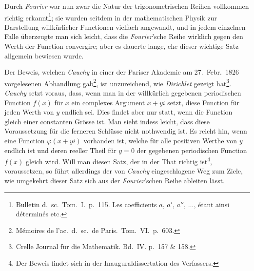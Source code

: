 \documentclass[12pt,a4paper]{article}
\begin{document}
Durch \textit{Fourier} war nun zwar die Natur der trigonometrischen Reihen vollkommen richtig erkannt\footnote{Bulletin d.\ sc.\ Tom.~I.\ p.~115. Les coefficients $a$, $a'$, $a''$, $\ldots$, étant ainsi déterminés etc.}; sie wurden seitdem in der mathematischen Physik zur Darstellung willkürlicher Functionen vielfach angewandt, und in jedem einzelnen Falle überzeugte man sich leicht, dass die \textit{Fourier}'sche Reihe wirklich gegen den Werth der Function convergire; aber es dauerte lange, ehe dieser wichtige Satz allgemein bewiesen wurde.

Der Beweis, welchen \textit{Cauchy} in einer der Pariser Akademie am 27.~Febr.\ 1826 vorgelesenen Abhandlung gab\footnote{Mémoires de l'ac.\ d.\ sc.\ de Paris.\ Tom.~VI.\ p.~603.}, ist unzureichend, wie \textit{Dirichlet} gezeigt hat\footnote{Crelle Journal für die Mathematik. Bd.~IV. p.~157 \& 158.}. \textit{Cauchy} setzt voraus, dass, wenn man in der willkürlich gegebenen periodischen Function $f(x)$ für $x$ ein complexes Argument $x + yi$ setzt, diese Function für jeden Werth von $y$ endlich sei. Dies findet aber nur statt, wenn die Function gleich einer constanten Grösse ist. Man sieht indess leicht, dass diese Voraussetzung für die ferneren Schlüsse nicht nothwendig ist. Es reicht hin, wenn eine Function $\varphi(x + yi)$ vorhanden ist, welche für alle positiven Werthe von $y$ endlich ist und deren reeller Theil für $y = 0$ der gegebenen periodischen Function $f(x)$ gleich wird. Will man diesen Satz, der in der That richtig ist\footnote{Der Beweis findet sich in der Inauguraldissertation des Verfassers.}, voraussetzen, so führt allerdings der von \textit{Cauchy} eingeschlagene Weg zum Ziele, wie umgekehrt dieser Satz sich aus der \textit{Fourier}'schen Reihe ableiten lässt.
\end{document}
